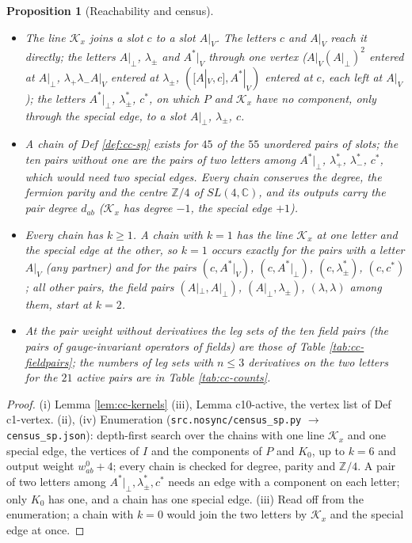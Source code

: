 \documentclass[11pt]{article}
\numberwithin{equation}{section}
\theoremstyle{plain}
\newtheorem{proposition}[theorem]{Proposition}
\theoremstyle{definition}
\newcommand{\Ap}{A|_{\perp}}
\newcommand{\AV}{A|_V}
\begin{document}
\begin{proposition}[Reachability and census]
\label{prop:cc-census}
\begin{itemize}
\item[(i)] The line $\mathcal K_x$ joins a slot $c$ to a slot $\AV$. The letters $c$ and $\AV$ reach it directly; the letters $\Ap$, $\lambda_\pm$ and $A^*|_V$ through one vertex ($\AV(\Ap)^2$ entered at $\Ap$, $\lambda_+\lambda_-\AV$ entered at $\lambda_\pm$, $([\AV,c],A^*|_V)$ entered at $c$, each left at $\AV$); the letters $A^*|_\perp$, $\lambda^*_\pm$, $c^*$, on which $P$ and $\mathcal K_x$ have no component, only through the special edge, to a slot $\Ap$, $\lambda_\pm$, $c$.
\item[(ii)] A chain of Def \ref{def:cc-sp} exists for $45$ of the $55$ unordered pairs of slots; the ten pairs without one are the pairs of two letters among $A^*|_\perp$, $\lambda^*_+$, $\lambda^*_-$, $c^*$, which would need two special edges. Every chain conserves the degree, the fermion parity and the centre $\mathbb Z/4$ of $SL(4,\mathbb C)$, and its outputs carry the pair degree $d_{ab}$ ($\mathcal K_x$ has degree $-1$, the special edge $+1$).
\item[(iii)] Every chain has $k\ge1$. A chain with $k=1$ has the line $\mathcal K_x$ at one letter and the special edge at the other, so $k=1$ occurs exactly for the pairs with a letter $\AV$ (any partner) and for the pairs $(c,A^*|_V)$, $(c,A^*|_\perp)$, $(c,\lambda^*_\pm)$, $(c,c^*)$; all other pairs, the field pairs $(\Ap,\Ap)$, $(\Ap,\lambda_\pm)$, $(\lambda,\lambda)$ among them, start at $k=2$.
\item[(iv)] At the pair weight without derivatives the leg sets of the ten field pairs (the pairs of gauge-invariant operators of fields) are those of Table \ref{tab:cc-fieldpairs}; the numbers of leg sets with $n\le3$ derivatives on the two letters for the $21$ active pairs are in Table \ref{tab:cc-counts}.
\end{itemize}
\end{proposition}

\begin{proof}
(i) Lemma \ref{lem:cc-kernels} (iii), Lemma c10-active, the vertex list of Def c1-vertex. (ii), (iv) Enumeration (\texttt{src.nosync/census\_sp.py} $\to$ \texttt{census\_sp.json}): depth-first search over the chains with one line $\mathcal K_x$ and one special edge, the vertices of $I$ and the components of $P$ and $K_0$, up to $k=6$ and output weight $w^0_{ab}+4$; every chain is checked for degree, parity and $\mathbb Z/4$. A pair of two letters among $A^*|_\perp,\lambda^*_\pm,c^*$ needs an edge with a component on each letter; only $K_0$ has one, and a chain has one special edge. (iii) Read off from the enumeration; a chain with $k=0$ would join the two letters by $\mathcal K_x$ and the special edge at once.
\end{proof}
\end{document}

